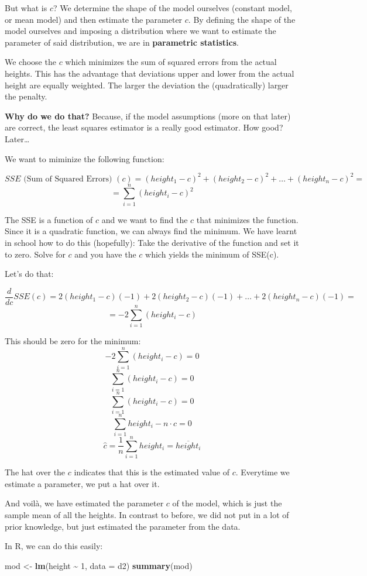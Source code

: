 \documentclass[
]{book}
\newenvironment{Shaded}{\begin{snugshade}}{\end{snugshade}}
\newcommand{\AttributeTok}[1]{\textcolor[rgb]{0.13,0.29,0.53}{#1}}
\newcommand{\DecValTok}[1]{\textcolor[rgb]{0.00,0.00,0.81}{#1}}
\newcommand{\FunctionTok}[1]{\textcolor[rgb]{0.13,0.29,0.53}{\textbf{#1}}}
\newcommand{\NormalTok}[1]{#1}
\newcommand{\OtherTok}[1]{\textcolor[rgb]{0.56,0.35,0.01}{#1}}
\newcommand{\SpecialCharTok}[1]{\textcolor[rgb]{0.81,0.36,0.00}{\textbf{#1}}}
\begin{document}
But what is \(c\)? We determine the shape of the model
ourselves (constant model, or mean model) and then estimate the parameter \(c\).
By defining the shape of the model ourselves and imposing a distribution where we want to
estimate the parameter of said distribution, we are in \textbf{parametric statistics}.

We choose the \(c\) which minimizes the sum of squared errors from the actual heights.
This has the advantage that deviations upper and lower from the actual height are
equally weighted. The larger the deviation the (quadratically) larger the penalty.

\textbf{Why do we do that?} Because, if the model assumptions (more on that later)
are correct, the least squares
estimator is a really good estimator. How good? Later\ldots{}

We want to miminize the following function:

\[ SSE \text{ (Sum of Squared Errors) }(c) = (height_1 - c)^2 + (height_2 - c)^2 + 
\ldots + (height_n - c)^2 =\]
\[ = \sum_{i=1}^{n} (height_i - c)^2\]

The SSE is a function of \(c\) and we want to find the \(c\) that minimizes the function.
Since it is a quadratic function, we can always find the minimum.
We have learnt in school how to do this (hopefully): Take the derivative of the function
and set it to zero. Solve for \(c\) and you have the \(c\) which yields the minimum of SSE(c).

Let's do that:

\[ \frac{d}{dc} SSE(c) =  2(height_1 - c)(-1) + 2(height_2 - c)(-1) + 
\ldots + 2(height_n - c)(-1) =\]
\[ = -2 \sum_{i=1}^{n} (height_i - c)\]

This should be zero for the minimum:
\[ -2 \sum_{i=1}^{n} (height_i - c) = 0\]
\[ \sum_{i=1}^{n} (height_i - c) = 0\]
\[ \sum_{i=1}^{n} (height_i - c) = 0\]
\[ \sum_{i=1}^{n} height_i - n \cdot c = 0\]
\[ \hat{c} = \frac{1}{n} \sum_{i=1}^{n} height_i = \overline{height_i}\]

The hat over the \(c\) indicates that this is the estimated value of \(c\).
Everytime we estimate a parameter, we put a hat over it.

And voilà, we have estimated the parameter \(c\) of the model, which is just the
sample mean of all the heights. In contrast to before, we did not put
in a lot of prior knowledge, but just estimated the parameter from the data.

In R, we can do this easily:

\begin{Shaded}
\begin{Highlighting}[]
\NormalTok{mod }\OtherTok{\textless{}{-}} \FunctionTok{lm}\NormalTok{(height }\SpecialCharTok{\textasciitilde{}} \DecValTok{1}\NormalTok{, }\AttributeTok{data =}\NormalTok{ d2)}
\FunctionTok{summary}\NormalTok{(mod)}
\end{Highlighting}
\end{Shaded}
\end{document}
